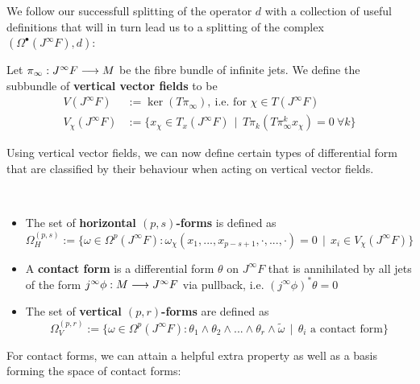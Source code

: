 We follow our successfull splitting of the operator $d$ with a collection of useful definitions that will in turn lead us to a splitting of the complex $(\Omega^\bullet(J^\infty F), d)$:

\begin{definition}
Let $\pi_\infty: J^\infty F \longrightarrow M$ be the fibre bundle of infinite jets. We define the subbundle of \textbf{vertical vector fields} to be
\begin{align*}
  V(J^\infty F) &:= \ker (T\pi_\infty), \ \text{i.e. for } \chi\in T(J^\infty F)\\
  V_\chi(J^\infty F) &:= \{ x_\chi \in T_x(J^\infty F) \ \ | \ \ T\pi_k(T\pi_\infty^k x_\chi) = 0 \ \forall k \}
\end{align*}
\end{definition}

Using vertical vector fields, we can now define certain types of differential form that are classified by their behaviour when acting on vertical vector fields.

\begin{definition}~
\begin{itemize}
  \item The set of \textbf{horizontal $(p,s)$-forms} is defined as
  $$ \Omega^{(p,s)}_H := \{ \omega \in \Omega^p(J^\infty F) : \omega_\chi (x_1, ..., x_{p-s+1}, \cdot, ..., \cdot) = 0 \ \ |\ \  x_i \in V_\chi(J^\infty F) \} $$

  \item A \textbf{contact form} is a differential form $\theta$ on $J^\infty F$ that is annihilated by all jets of the form $j^\infty \phi : M \lra J^\infty F$ via pullback, i.e. $(j^\infty \phi)^* \theta = 0$

  \item The set of \textbf{vertical $(p,r)$-forms} are defined as
  $$ \Omega^{(p,r)}_V := \{ \omega \in \Omega^p(J^\infty F) : \theta_1 \wedge \theta_2 \wedge ... \wedge \theta_r \wedge \widetilde \omega \ \ |\ \  \theta_i \text{ a  contact form} \} $$
\end{itemize}
\end{definition}

For contact forms, we can attain a helpful extra property as well as a basis forming the space of contact forms:

